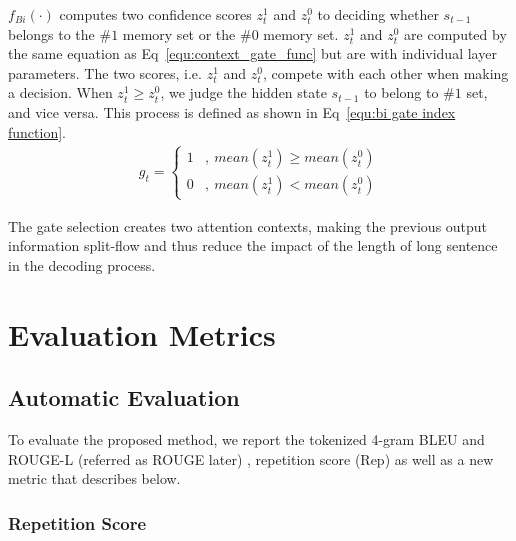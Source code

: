 \documentclass[letterpaper]{article} %
\begin{document}
$f_{Bi}(\cdot)$ computes two confidence scores $z^1_t$ and $z^0_t$ to deciding whether $s_{t-1}$  belongs to the \#$1$ memory set or the \#$0$ memory set. $z^1_t$ and $z^0_t$ are computed by the same equation as Eq~\eqref{equ:context_gate_func} but are with individual layer parameters. The two scores, i.e. $z^1_t$ and $z^0_t$, compete with each other when making a decision. When $z^1_t \geq z^0_t$, we judge the hidden state $s_{t-1}$ to belong to \#$1$ set, and vice versa. This process is defined as shown in Eq~\eqref{equ:bi gate index function}.
\begin{align}
\label{equ:bi gate index function}
g_t = \begin{cases} 1 & ,\ mean(z_t^1) \ge mean(z_t^0) \\
					0 &,\ mean(z_t^1) < mean(z_t^0)
\end{cases}
\end{align}

The gate selection creates two attention contexts, making the previous output information split-flow and thus reduce the impact of the length of long sentence in the decoding process.

\section{Evaluation Metrics}
\subsection{Automatic Evaluation}

To evaluate the proposed method, we report the tokenized 4-gram BLEU \cite{papineni2002bleu} and ROUGE-L (referred as ROUGE later) \cite{lin2004rouge}, repetition score (Rep) \cite{malaviya2018sparse} as well as a new metric that describes below.

\subsubsection{Repetition Score}
\end{document}
